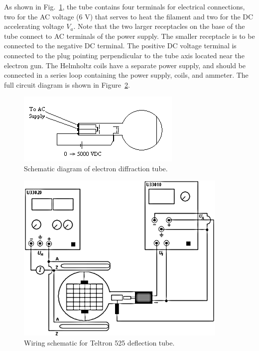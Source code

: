 As shown in Fig.~\ref{tubewiring2}, the tube contains four terminals for electrical
connections, two for the AC voltage (6 V) that serves to heat the
filament and two for the DC accelerating voltage $V_a$.
 Note that the two larger receptacles on the base of the tube connect
to AC terminals of the power supply.  The smaller receptacle is to be
connected to the negative DC terminal.  The positive DC voltage
terminal is connected to the plug pointing perpendicular to the tube
axis located near the electron gun.
The Helmholtz coils have a separate power supply, and should be connected in a series loop containing the power supply, coils, and ammeter. The full circuit diagram is shown in Figure~\ref{tubewiring}.

\begin{figure}
\begin{center}
\includegraphics[width=3.0929in,height=1.3543in]{../images/ediffraction-img1.png}
\caption{Schematic diagram of electron diffraction tube.}
\label{tubewiring2}
\end{center}
\end{figure}


\begin{figure}
\begin{center}
\includegraphics[width=4in]{../images/wiring.png} 
\caption{Wiring schematic for Teltron 525 deflection tube.}
\label{tubewiring}
\end{center}
\end{figure}


